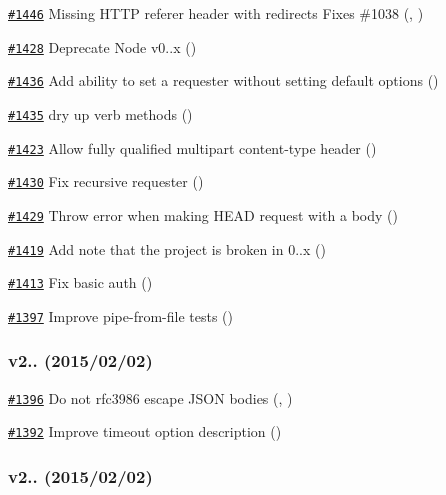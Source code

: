\begin{DoxyItemize}
\item \href{https://github.com/request/request/pull/1446}{\tt \#1446} Missing H\+T\+TP referer header with redirects Fixes \#1038 (, )
\item \href{https://github.com/request/request/pull/1428}{\tt \#1428} Deprecate Node v0..\+x ()
\item \href{https://github.com/request/request/pull/1436}{\tt \#1436} Add ability to set a requester without setting default options ()
\item \href{https://github.com/request/request/pull/1435}{\tt \#1435} dry up verb methods ()
\item \href{https://github.com/request/request/pull/1423}{\tt \#1423} Allow fully qualified multipart content-\/type header ()
\item \href{https://github.com/request/request/pull/1430}{\tt \#1430} Fix recursive requester ()
\item \href{https://github.com/request/request/pull/1429}{\tt \#1429} Throw error when making H\+E\+AD request with a body ()
\item \href{https://github.com/request/request/pull/1419}{\tt \#1419} Add note that the project is broken in 0..\+x ()
\item \href{https://github.com/request/request/pull/1413}{\tt \#1413} Fix basic auth ()
\item \href{https://github.com/request/request/pull/1397}{\tt \#1397} Improve pipe-\/from-\/file tests ()
\end{DoxyItemize}

\subsubsection*{v2.. (2015/02/02)}


\begin{DoxyItemize}
\item \href{https://github.com/request/request/pull/1396}{\tt \#1396} Do not rfc3986 escape J\+S\+ON bodies (, )
\item \href{https://github.com/request/request/pull/1392}{\tt \#1392} Improve {\ttfamily timeout} option description ()
\end{DoxyItemize}

\subsubsection*{v2.. (2015/02/02)}


